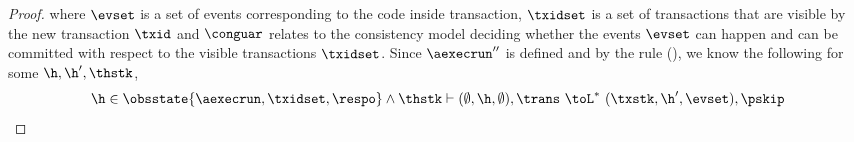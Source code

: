 \begin{proof}
where \( \evset \) is a set of events corresponding to the code inside transaction, \( \txidset \) is  a set of transactions that are visible by the new transaction \( \txid \) and \( \conguar \) relates to the consistency model deciding whether the events \( \evset \) can happen and can be committed with respect to the visible transactions \( \txidset \).
Since \( \aexecrun'' \) is defined and by the  rule (), we know the following for some \( \h, \h', \thstk \),
\begin{equation}
    \label{equ:local-transfer}
    \h \in \obsstate{\aexecrun, \txidset, \respo}
    \land \thstk \vdash (\emptyset, \h, \emptyset) , \trans \ \toL^{*} \  (\txstk, \h', \evset) , \pskip 
\end{equation}
\end{proof}
